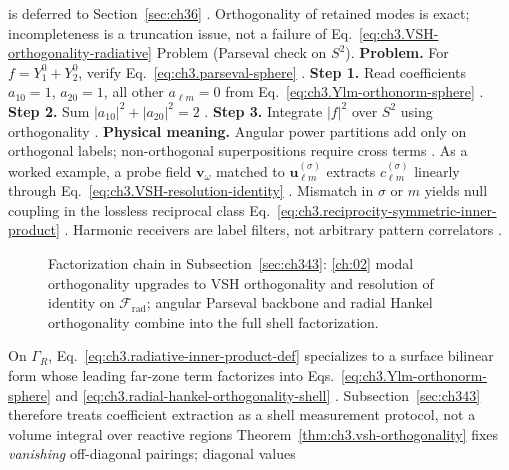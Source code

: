 is deferred to Section~\ref{sec:ch36} . Orthogonality of retained modes is exact;
incompleteness is a truncation issue, not a failure of Eq.~\eqref{eq:ch3.VSH-orthogonality-radiative}
Problem (Parseval check on \(S^{2}\)). \textbf{Problem.} For \(f=Y_{1}^{0}+Y_{2}^{0}\), verify Eq.~\eqref{eq:ch3.parseval-sphere} .
\textbf{Step 1.} Read coefficients \(a_{10}=1\), \(a_{20}=1\), all other \(a_{\ell m}=0\) from
Eq.~\eqref{eq:ch3.Ylm-orthonorm-sphere} .
\textbf{Step 2.} Sum \(|a_{10}|^{2}+|a_{20}|^{2}=2\) .
\textbf{Step 3.} Integrate \(|f|^{2}\) over \(S^{2}\) using orthogonality .
\textbf{Physical meaning.} Angular power partitions add only on orthogonal labels; non-orthogonal superpositions
require cross terms .
As a worked example, a probe field \(\mathbf{v}_\omega\) matched to \(\mathbf{u}_{\ell m}^{(\sigma)}\) extracts
\(c_{\ell m}^{(\sigma)}\) linearly through Eq.~\eqref{eq:ch3.VSH-resolution-identity} .
Mismatch in \(\sigma\) or \(m\) yields null coupling in the lossless reciprocal class
Eq.~\eqref{eq:ch3.reciprocity-symmetric-inner-product} . Harmonic receivers are label filters,
not arbitrary pattern correlators .
\begin{figure}[t]
\centering
{}
\caption{Factorization chain in Subsection~\ref{sec:ch343}: \ref{ch:02} modal orthogonality upgrades to VSH orthogonality
and resolution of identity on \(\mathcal{F}_{\mathrm{rad}}\); angular Parseval backbone and radial Hankel orthogonality
combine into the full shell factorization.}
\label{fig:ch3.343-orthogonality-factorization}
\end{figure}
On \(\Gamma_R\), Eq.~\eqref{eq:ch3.radiative-inner-product-def} specializes to a surface bilinear form whose leading
far-zone term factorizes into Eqs.~\eqref{eq:ch3.Ylm-orthonorm-sphere} and
\eqref{eq:ch3.radial-hankel-orthogonality-shell} . Subsection~\ref{sec:ch343} therefore
treats coefficient extraction as a shell measurement protocol, not a volume integral over reactive regions
Theorem~\ref{thm:ch3.vsh-orthogonality} fixes \emph{vanishing} off-diagonal pairings; diagonal values
